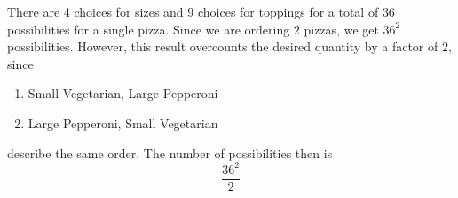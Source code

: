 There are $4$ choices for sizes and $9$ choices for toppings for a total of $36$ 
possibilities for a single pizza. Since we are ordering $2$ pizzas, we get $36^{2}$ 
possibilities. However, this result overcounts the desired quantity by 
a factor of $2$, since

\begin{enumerate}
\item Small Vegetarian, Large Pepperoni

\item Large Pepperoni, Small Vegetarian
\end{enumerate}

describe the same order. The number of possibilities then is $$\frac{36^{2}}{2}$$